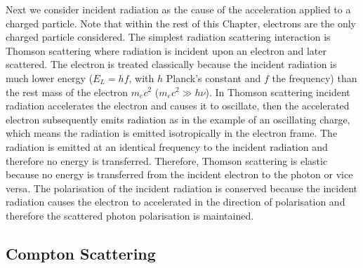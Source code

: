\documentclass[../main.tex]{subfiles}
\begin{document}
Next we consider incident radiation as the cause of the acceleration applied to a charged particle. Note that within the rest of this Chapter, electrons are the only charged particle considered. The simplest radiation scattering interaction is Thomson scattering \cite{thomson1904xxxiv} where radiation is incident upon an electron and later scattered. The electron is treated classically because the incident radiation is much lower energy ($E_{L}=hf$, with $h$ Planck's constant and $f$ the frequency) than the rest mass of the electron $m_{e}c^{2}$ ($m_{e}c^{2}\gg h\nu$). In Thomson scattering incident radiation accelerates the electron and causes it to oscillate, then the accelerated electron subsequently emits radiation as in the example of an oscillating charge, which means the radiation is emitted isotropically in the electron frame. The radiation is emitted at an identical frequency to the incident radiation and therefore no energy is transferred. Therefore, Thomson scattering is elastic because no energy is transferred from the incident electron to the photon or vice versa. The polarisation of the incident radiation is conserved because the incident radiation causes the electron to accelerated in the direction of polarisation and therefore the scattered photon polarisation is maintained.

\subsection{Compton Scattering}
\end{document}
